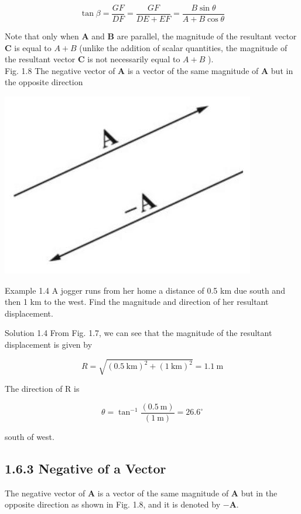 \documentclass[10pt]{article}
\begin{document}
$$
\tan \beta=\frac{G F}{D F}=\frac{G F}{D E+E F}=\frac{B \sin \theta}{A+B \cos \theta}
$$

Note that only when $\mathbf{A}$ and $\mathbf{B}$ are parallel, the magnitude of the resultant vector $\mathbf{C}$ is equal to $A+B$ (unlike the addition of scalar quantities, the magnitude of the resultant vector $\mathbf{C}$ is not necessarily equal to $A+B$ ).\\
Fig. 1.8 The negative vector of $\mathbf{A}$ is a vector of the same magnitude of $\mathbf{A}$ but in the opposite direction

\begin{center}
\includegraphics[max width=\textwidth]{2024_09_13_db1f357d2aad0a03eb2eg-015(1)}
\end{center}

Example 1.4 A jogger runs from her home a distance of 0.5 km due south and then 1 km to the west. Find the magnitude and direction of her resultant displacement.

Solution 1.4 From Fig. 1.7, we can see that the magnitude of the resultant displacement is given by

$$
R=\sqrt{(0.5 \mathrm{~km})^{2}+(1 \mathrm{~km})^{2}}=1.1 \mathrm{~m}
$$

The direction of R is

$$
\theta=\tan ^{-1} \frac{(0.5 \mathrm{~m})}{(1 \mathrm{~m})}=26.6^{\circ}
$$

south of west.

\subsection*{1.6.3 Negative of a Vector}
The negative vector of $\mathbf{A}$ is a vector of the same magnitude of $\mathbf{A}$ but in the opposite direction as shown in Fig. 1.8, and it is denoted by $-\mathbf{A}$.
\end{document}
